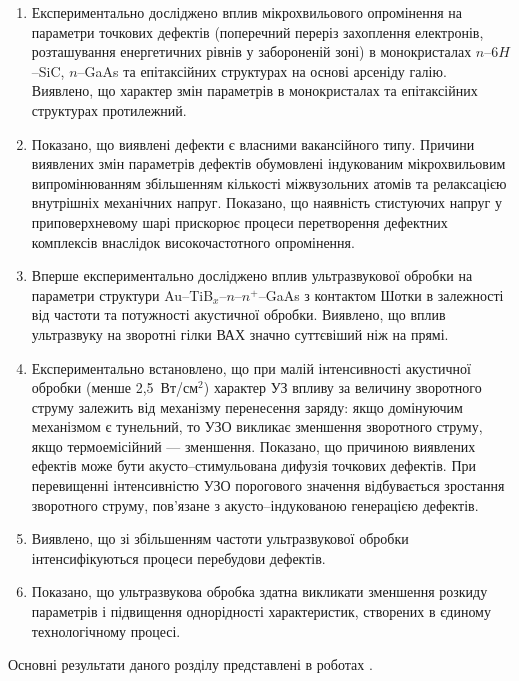 \documentclass[a4paper,14pt,oneside,openany]{memoir}
\begin{document}
  \begin{enumerate}
\item Експериментально досліджено вплив мікрохвильового опромінення на параметри точкових дефектів (поперечний переріз захоплення електронів,
розташування енергетичних рівнів у забороненій зоні) в монокристалах $n$--6$H$--SiC, $n$--GaAs та епітаксійних структурах на основі арсеніду галію.
Виявлено, що характер змін параметрів в монокристалах та епітаксійних структурах протилежний.

\item Показано, що виявлені дефекти є власними вакансійного типу.
Причини виявлених змін параметрів дефектів обумовлені індукованим мікрохвильовим випромінюванням
збільшенням кількості міжвузольних атомів та релаксацією внутрішніх механічних напруг.
Показано, що наявність стистуючих напруг у приповерхневому шарі прискорює процеси перетворення дефектних комплексів внаслідок високочастотного опромінення.

     \item Вперше експериментально досліджено вплив ультразвукової обробки на параметри структури Au--TiB$_x$--$n$--$n^+$--GaAs з контактом Шотки
 в залежності від частоти та потужності акустичної обробки.
Виявлено, що вплив ультразвуку на зворотні гілки ВАХ значно суттєвіший ніж на прямі.

\item Експериментально встановлено, що при малій інтенсивності акустичної обробки (менше 2,5~Вт/см$^2$) характер УЗ впливу за величину зворотного струму залежить від механізму перенесення заряду:
  якщо домінуючим механізмом є тунельний, то УЗО викликає зменшення зворотного струму, якщо термоемісійний --- зменшення.
  Показано, що причиною виявлених ефектів може бути акусто--стимульована дифузія точкових дефектів.
  При перевищенні інтенсивністю УЗО порогового значення відбувається зростання зворотного струму, пов'язане з акусто--індукованою генерацією дефектів.

\item Виявлено, що зі збільшенням частоти ультразвукової обробки інтенсифікуються процеси перебудови дефектів.

\item Показано, що ультразвукова обробка здатна викликати зменшення розкиду параметрів і підвищення однорідності характеристик, створених в єдиному технологічному процесі.
 \end{enumerate}	

Основні результати даного розділу представлені в роботах \cite{Olikh:SPQEO2003,Olikh:PJE2004,Olikh:PhChOM2005,Olikh:PZTF2006,Gorb2010,
3Tomsk,50IUFFC,9APTTE,ICU2007GA,6DrogGorb}.
\end{document}
